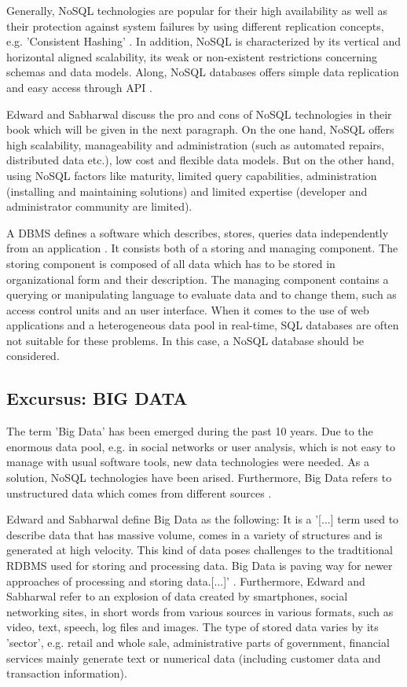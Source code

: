 Generally, NoSQL technologies are popular for their high availability as well as their protection against system failures by using different replication concepts, e.g. 'Consistent Hashing' \cite[p.11 ff.]{nosql_meier}. In addition, NoSQL is characterized by its vertical and horizontal aligned scalability, its weak or non-existent restrictions concerning schemas and data models. Along, NoSQL databases offers simple data replication and easy access through API \cite[p.221 ff.]{nosql_meier}.  

Edward and Sabharwal discuss the pro and cons of NoSQL technologies in their book \cite[p.17 ff.]{mongodb_edward} which will be given in the next paragraph.
On the one hand, NoSQL offers high scalability, manageability and administration (such as automated repairs, distributed data etc.), low cost and flexible data models. But on the other hand, using NoSQL factors like maturity, limited query capabilities, administration (installing and maintaining solutions) and limited expertise (developer and administrator community are limited).

A \ac{DBMS} defines a software which describes, stores, queries data independently from an application \cite[p.2 ff.]{nosql_meier}. It consists both of a storing and managing component. The storing component is composed of all data which has to be stored in organizational form and their description. The managing component contains a querying or manipulating language to evaluate data and to change them, such as access control units and an user interface. When it comes to the use of web applications and a heterogeneous data pool in real-time, SQL databases are often not suitable for these problems. In this case, a NoSQL database should be considered. 

\subsection{Excursus: BIG DATA} \label{bigdata}

The term 'Big Data' has been emerged during the past 10 years. Due to the enormous data pool, e.g. in social networks or user analysis, which is not easy to manage with usual software tools, new data technologies were needed. As a solution, NoSQL technologies have been arised. Furthermore, Big Data refers to unstructured data which comes from different sources \cite{nosql_meier}. 

Edward and Sabharwal define Big Data as the following: It is a '[...] term used to describe data that has massive volume, comes in a variety of structures and is generated at high velocity. This kind of data poses challenges to the tradtitional \ac{RDBMS} used for storing and processing data. Big Data is paving way for newer approaches of processing and storing data.[...]' \cite[p.1 ff.]{mongodb_edward}. Furthermore, Edward and Sabharwal refer to an explosion of data created by smartphones, social networking sites, in short words from various sources in various formats, such as video, text, speech, log files and images. The type of stored data varies by its 'sector', e.g. retail and whole sale, administrative parts of government, financial services mainly generate text or numerical data (including customer data and transaction information). 

